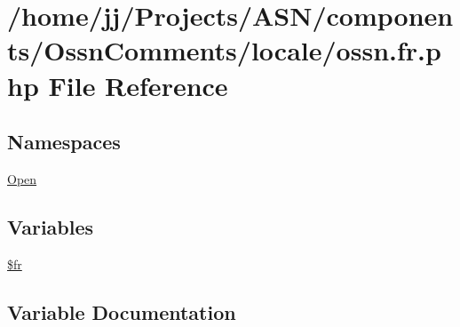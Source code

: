 \hypertarget{components_2_ossn_comments_2locale_2ossn_8fr_8php}{}\section{/home/jj/\+Projects/\+A\+S\+N/components/\+Ossn\+Comments/locale/ossn.fr.\+php File Reference}
\label{components_2_ossn_comments_2locale_2ossn_8fr_8php}
\subsection*{Namespaces}
\begin{DoxyCompactItemize}
\item 
 \hyperlink{namespace_open}{Open}
\end{DoxyCompactItemize}
\subsection*{Variables}
\begin{DoxyCompactItemize}
\item 
\hyperlink{components_2_ossn_comments_2locale_2ossn_8fr_8php_ad5107c697816e7b7f89ad1b3e94e3e0e}{\$fr}
\end{DoxyCompactItemize}


\subsection{Variable Documentation}
